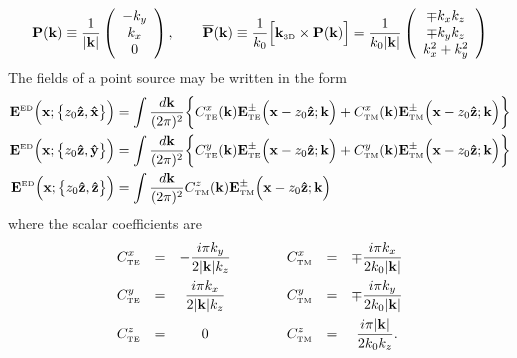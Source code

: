 \documentclass[letterpaper]{article}
\begin{document}
$$ \mathbf{P}(\mathbf{k}) \equiv
   \frac{1}{|\mathbf{k}|}
   \left(\begin{array}{c}-k_y \\ k_x \\ 0 \end{array}\right),
   \qquad
   \overline{\mathbf{P}}(\mathbf{k}) \equiv
   \frac{1}{k_0}\Big[ \mathbf{k}_{\hbox{\tiny{3D}}} \times \mathbf{P}(\mathbf{k}) \Big]
   =
   \frac{1}{k_0 |\mathbf{k}|}
   \left(\begin{array}{c} \mp k_x k_z \\ \mp k_y k_z \\ k_x^2 + k_y^2 
         \end{array}\right)
$$
The fields of a point source may be written in the form
\begin{align*}
 \mathbf{E}^{\hbox{\tiny{ED}}}\Big(\mathbf{x}; \big\{ z_0 \mathbf{\hat z}, \mathbf{\hat x} \big\}\Big)
&= \int \frac{d \mathbf{k}}{(2\pi)^2} 
   \bigg\{ C^{x}_{\hbox{\tiny{TE}}}(\mathbf{k})
           \mathbf{E}^\pm_{\hbox{\tiny{TE}}}\Big(\mathbf{x}-z_0\mathbf{\hat z}; \mathbf{k}\Big)
          + 
           C^{x}_{\hbox{\tiny{TM}}}(\mathbf{k})
           \mathbf{E}^\pm_{\hbox{\tiny{TM}}}\Big(\mathbf{x}-z_0\mathbf{\hat z}; \mathbf{k}\Big)
   \bigg\}
\\
 \mathbf{E}^{\hbox{\tiny{ED}}}\Big(\mathbf{x}; \big\{ z_0 \mathbf{\hat z}, \mathbf{\hat y} \big\}\Big)
&= \int \frac{d \mathbf{k}}{(2\pi)^2} 
   \bigg\{ C^{y}_{\hbox{\tiny{TE}}}(\mathbf{k})
           \mathbf{E}^\pm_{\hbox{\tiny{TE}}}\Big(\mathbf{x}-z_0\mathbf{\hat z}; \mathbf{k}\Big)
          + 
           C^{y}_{\hbox{\tiny{TM}}}(\mathbf{k})
           \mathbf{E}^\pm_{\hbox{\tiny{TM}}}\Big(\mathbf{x}-z_0\mathbf{\hat z}; \mathbf{k}\Big)
   \bigg\}
\\
 \mathbf{E}^{\hbox{\tiny{ED}}}\Big(\mathbf{x}; \big\{ z_0 \mathbf{\hat z}, \mathbf{\hat z} \big\}\Big)
&= \int \frac{d \mathbf{k}}{(2\pi)^2} 
           C^{z}_{\hbox{\tiny{TM}}}(\mathbf{k})
           \mathbf{E}^\pm_{\hbox{\tiny{TM}}}\Big(\mathbf{x}-z_0\mathbf{\hat z}; \mathbf{k}\Big)
\end{align*}
where the scalar coefficients are 
$$\begin{array}{ccccccc}
 \displaystyle{ C^{x}_{\hbox{\tiny{TE}}} }
 &=& 
  \displaystyle{ -\frac{ i \pi k_y}{2|\mathbf{k}|k_z} }
 &\qquad&
 \displaystyle{ C^{x}_{\hbox{\tiny{TM}}} }
 &=& 
 \displaystyle{ \mp \frac{ i \pi k_x }{2k_0|\mathbf{k}|} }
\\[10pt]
 \displaystyle{ C^{y}_{\hbox{\tiny{TE}}} }
 &=& 
  \displaystyle{ \frac{ i \pi k_x}{2|\mathbf{k}|k_z} }
 &\qquad&
 \displaystyle{ C^{y}_{\hbox{\tiny{TM}}} }
 &=& 
 \displaystyle{ \mp \frac{ i \pi k_y }{2k_0|\mathbf{k}|} }
\\[10pt]
 \displaystyle{ C^{z}_{\hbox{\tiny{TE}}} }
 &=& 0
 &\qquad&
 \displaystyle{ C^{z}_{\hbox{\tiny{TM}}} }
 &=& \displaystyle{ \frac{ i\pi |\mathbf{k}|  }{2k_0 k_z} }.
\end{array}$$
\end{document}
